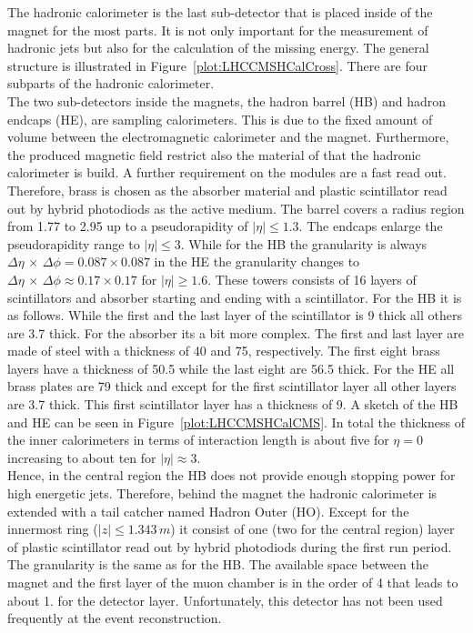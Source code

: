 The hadronic calorimeter is the last sub-detector that is placed inside of the magnet for the most parts. It is not only important for the measurement of hadronic jets but also for the calculation of the missing energy. The general structure is illustrated in Figure~\ref{plot:LHCCMSHCalCross}. There are four subparts of the hadronic calorimeter.\\
The two sub-detectors inside the magnets, the hadron barrel (HB) and hadron endcaps (HE), are sampling calorimeters. This is due to the fixed amount of volume between the electromagnetic calorimeter and the magnet. Furthermore, the produced magnetic field restrict also the material of that the hadronic calorimeter is build. A further requirement on the modules are a fast read out. Therefore, brass is chosen as the absorber material and plastic scintillator read out by hybrid photodiods as the active medium. The barrel covers a radius region from 1.77 to 2.95\m{} up to a pseudorapidity of $\left|\eta{}\right| \leq{} 1.3$. The endcaps enlarge the pseudorapidity range to $\left|\eta{}\right| \leq{} 3$. While for the HB the granularity is always $\Delta{}\eta\,\times\,\Delta{}\phi{} = 0.087 \times{} 0.087$ in the HE the granularity changes to $\Delta{}\eta\,\times\,\Delta{}\phi{} \approx 0.17 \times{} 0.17$ for $\left|\eta{}\right| \geq{} 1.6$. These towers consists of 16 layers of scintillators and absorber starting and ending with a scintillator. For the HB it is as follows. While the first and the last layer of the scintillator is 9\mm{} thick all others are 3.7\mm{} thick. For the absorber its a bit more complex. The first and last layer are made of steel with a thickness of 40\mm{} and 75\mm{}, respectively. The first eight brass layers have a thickness of 50.5\mm{} while the last eight are 56.5\mm{} thick. For the HE all brass plates are 79\mm{} thick and except for the first scintillator layer all other layers are 3.7\mm{} thick. This first scintillator layer has a thickness of 9\mm{}. A sketch of the HB and HE can be seen in Figure~\ref{plot:LHCCMSHCalCMS}. In total the thickness of the inner calorimeters in terms of interaction length is about five for $\eta{}=0$ increasing to about ten for $\left|\eta{}\right|\approx{}3$.\\
Hence, in the central region the HB does not provide enough stopping power for high energetic jets. Therefore, behind the magnet the hadronic calorimeter is extended with a tail catcher named Hadron Outer (HO). Except for the innermost ring ($\left|z\right| \leq{} 1.343\,m$) it consist of one (two for the central region) layer of plastic scintillator read out by hybrid photodiods during the first run period. The granularity is the same as for the HB. The available space between the magnet and the first layer of the muon chamber is in the order of 4\cm{} that leads to about 1.\cm{} for the detector layer. Unfortunately, this detector has not been used frequently at the event reconstruction.
